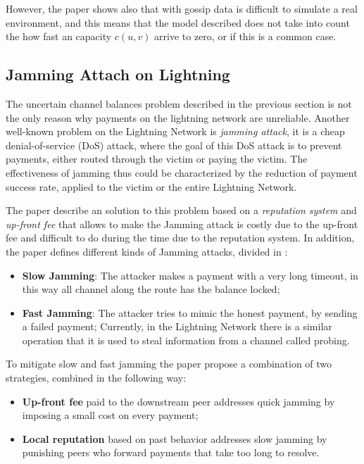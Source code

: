 However, the paper shows also that with gossip data is difficult to simulate 
a real environment, and this means that the model described does not take into 
count the how fast an capacity $c(u, v)$ arrive to zero, or if this is a 
common case.

\subsection{Jamming Attach on Lightning}

The uncertain channel balances problem described in the previous section 
is not the only reason why payments on the lightning network are unreliable.
Another well-known problem on the Lightning Network is \emph{jamming attack},
it is a cheap denial-of-service (DoS) attack, where the goal of this DoS attack 
is to prevent payments, either routed through the victim or paying the victim. 
The effectiveness of jamming thus could be characterized by the reduction of 
payment success rate, applied to the victim or the entire Lightning Network.

The paper \cite{cryptoeprint:2022/1454} describe an solution to this problem 
based on a \emph{reputation system} and \emph{up-front fee} that allows to make
the Jamming attack is costly due to the up-front fee and difficult to do during the time 
due to the reputation system.
In addition, the paper defines different kinds of Jamming attacks, divided in :

\begin{itemize}
    \item {\bf Slow Jamming}: The attacker makes a payment with a very long timeout, 
        in this way all channel along the route has the balance locked;
    \item {\bf Fast Jamming}: The attacker tries to mimic the honest payment, by sending
        a failed payment; Currently, in the Lightning Network there is a similar operation
        that it is used to steal information from a channel called probing.
\end{itemize}

To mitigate slow and fast jamming the paper \cite{cryptoeprint:2022/1454}
propose a combination of two strategies, combined in the following way:

\begin{itemize}
    \item {\bf Up-front fee} paid to the downstream peer addresses quick jamming 
        by imposing a small cost on every payment;
    \item {\bf Local reputation} based on past behavior addresses slow jamming by 
        punishing peers who forward payments that take too long to resolve.
\end{itemize}

